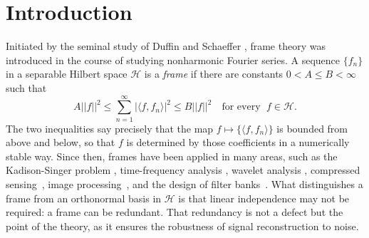 \documentclass{amsart}
\theoremstyle{definition}
\theoremstyle{remark}
\numberwithin{equation}{section}
\begin{document}
\section{Introduction}

Initiated by the seminal study of Duffin and Schaeffer \cite{duffin1952class}, frame theory was introduced in the course of studying nonharmonic Fourier series. A sequence $\{ f_n\}$ in a separable Hilbert space $\mathcal{H}$ is a \emph{frame} if there are constants $0< A \leq B <\infty$ such that
\begin{equation*}
    A ||f||^2 \leq \sum_{n=1}^\infty | \langle f ,f_n \rangle |^2 \leq B||f||^2 \quad \text{for every }\; f \in \mathcal{H}.
\end{equation*}
The two inequalities say precisely that the map $f \mapsto \{ \langle f , f_n \rangle\}$ is bounded from above and below, so that $f$ is determined by those coefficients in a numerically stable way. Since then, frames have been applied in many areas, such as the Kadison-Singer problem \cite{casazza2013kadison},  time-frequency analysis \cite{grochenig2001foundations}, wavelet analysis \cite{daubechies1992ten}, compressed sensing~\cite{naidu2020construction}, image processing~\cite{kutyniok2012multiscale},  and the design of filter banks~\cite{fickus2013finite}.  
What distinguishes a frame from an orthonormal basis in $\mathcal{H}$ is that linear independence may not be required: a frame can be redundant. That redundancy is not a defect but the point of the theory, as it ensures the robustness of signal reconstruction to noise.
\end{document}
